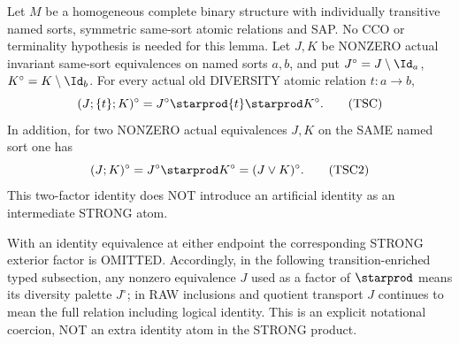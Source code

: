 \begin{lemma}
\label{lem:typed-raw-strong-saturation}
Let $M$ be a homogeneous complete binary structure with individually
transitive named sorts, symmetric same-sort atomic relations and SAP.
No CCO or terminality hypothesis is needed for this lemma.
Let \(J,K\) be NONZERO actual
invariant same-sort equivalences on
named sorts \(a,b\), and put
\(J^\circ=J\setminus\Id_a\),
\(K^\circ=K\setminus\Id_b\).
For every actual old DIVERSITY
atomic relation \(t:a\to b\),
\[
       (J;\{t\};K)^\circ
        =J^\circ\starprod\{t\}
                          \starprod K^\circ.
\tag{TSC}\label{eq:typed-raw-strong-saturation}
\]
In addition, for two NONZERO actual
equivalences \(J,K\) on the SAME named
sort one has
\[
     (J;K)^\circ
           =J^\circ\starprod K^\circ
           =(J\vee K)^\circ.
\tag{TSC2}\label{eq:typed-equivalence-join-strong}
\]
This two-factor identity does NOT
introduce an artificial identity
as an intermediate STRONG atom.

With an identity equivalence at
either endpoint the corresponding
STRONG exterior factor is OMITTED.
Accordingly, in the following
transition-enriched typed subsection,
any nonzero equivalence \(J\) used
as a factor of \(\starprod\) means
its diversity palette \(J^\circ\);
in RAW inclusions and quotient
transport \(J\) continues to mean
the full relation including
logical identity. This is an
explicit notational coercion,
NOT an extra identity atom in
the STRONG product.
\end{lemma}
